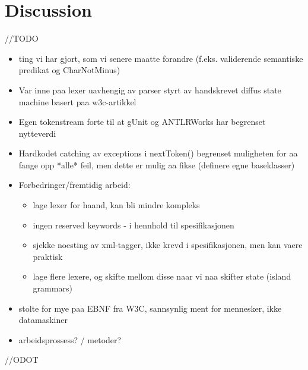 \chapter{Discussion}

//TODO

\begin{itemize}
\item ting vi har gjort, som vi senere maatte forandre (f.eks. validerende semantiske predikat og CharNotMinus)
\item Var inne paa lexer uavhengig av parser styrt av handskrevet diffus state machine basert paa w3c-artikkel
\item Egen tokenstream forte til at gUnit og ANTLRWorks har begrenset nytteverdi
\item Hardkodet catching av exceptions i nextToken() begrenset muligheten for aa
fange opp *alle* feil, men dette er mulig aa fikse (definere egne baseklasser)
\item Forbedringer/fremtidig arbeid:
\begin{itemize}
\item lage lexer for haand, kan bli mindre kompleks
\item ingen reserved keywords - i hennhold til spesifikasjonen
\item sjekke noesting av xml-tagger, ikke krevd i spesifikasjonen, men kan vaere praktisk
\item lage flere lexere, og skifte mellom disse naar vi naa skifter state
(island grammars)
\end{itemize}
\item stolte for mye paa EBNF fra W3C, sannsynlig ment for mennesker, ikke datamaskiner
\item arbeidsprossess? / metoder?
\end{itemize}


//ODOT